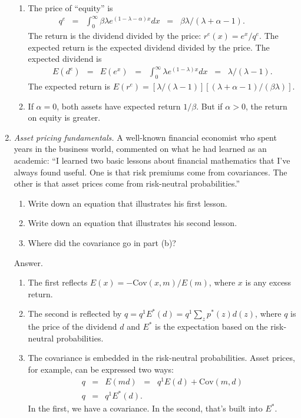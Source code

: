 \documentclass[11pt]{article}
\begin{document}
\begin{enumerate}
\begin{enumerate}
\item The price of ``equity'' is
\begin{eqnarray*}
    q^e &=& \int_{0}^\infty \beta \lambda e^{(1-\lambda -\alpha) x} dx
            \;\;=\;\; \beta \lambda /(\lambda + \alpha-1) . \phantom{sum^K}
\end{eqnarray*}
The return is the dividend divided by the price:  $r^e(x) = e^x/q^e$.
The expected return is the expected dividend divided by the price.
The expected dividend is
\begin{eqnarray*}
    E(d^e) &=& E(e^x) \;\;=\;\; \int_{0}^\infty \lambda e^{(1-\lambda) x} dx
            \;\;=\;\; \lambda/(\lambda-1) .
\end{eqnarray*}
The expected return is $ E(r^e) = [\lambda/(\lambda-1)] [(\lambda+\alpha-1)/(\beta \lambda) ]$.

\item If $\alpha = 0$, both assets have expected return $1/\beta$.
But if $\alpha > 0$, the return on equity is greater.
\end{enumerate}

\item {\it Asset pricing fundamentals.\/}
A well-known financial economist who spent years in the business world,
commented on what he had learned as an academic:
``I learned two basic lessons about financial mathematics
that I've always found useful.
One is that risk premiums come from covariances.
The other is that asset prices come from risk-neutral probabilities.''
%
\begin{enumerate}
\item Write down an equation that illustrates his first lesson.
\item Write down an equation that illustrates his second lesson.
\item Where did the covariance go in part (b)?
\end{enumerate}

Answer. 
\begin{enumerate}
\item The first reflects $ E(x) = - \mbox{Cov}(x,m)/E(m) $,
where $x$ is any excess return.

\item The second is reflected by $ q = q^1 E^*(d) = q^1 \sum_z p^*(z) d(z) $,
where $q$ is the price of the dividend $d$ and $E^*$ is the expectation based on
the risk-neutral probabilities.

\item The covariance is embedded in the risk-neutral probabilities.
Asset prices, for example, can be expressed two ways:
\begin{eqnarray*}
    q &=& E (m d) \;\;=\;\; q^1 E(d) + \mbox{Cov}(m,d) \\
    q &=& q^1 E^*(d) .
\end{eqnarray*}
In the first, we have a covariance.
In the second, that's built into $E^*$.
\end{enumerate}

\end{enumerate}



\end{document}
